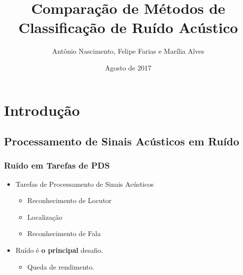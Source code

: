 \documentclass{beamer}
\title[Ciência de Dados]{Comparação de Métodos de Classificação de Ruído Acústico}
\author[Nascimento, Farias, Alves]
{
Antônio Nascimento, Felipe Farias e Marília Alves
}
\institute[IME]{%
Instituto Militar de Engenharia \\
}
\date[Agosto de 2017] %
{Agosto de 2017}
\begin{document}

\justifying

\begin{frame}
  \titlepage
\end{frame}




\section[Sumário]{}
\begin{frame}
  \tableofcontents
\end{frame}




\section{Introdução}

\subsection{Processamento de Sinais Acústicos em Ruído}

\begin{frame}
	\justifying
  	\frametitle{Ruído em Tarefas de PDS}
  	
  	\begin{itemize}
  		\setlength\itemsep{1em}
  		\item Tarefas de Processamento de Sinais Acústicos
        \begin{itemize}
        	\item Reconhecimento de Locutor
            \item Localização
            \item Reconhecimento de Fala
        \end{itemize}
        \item Ruído é \textbf{o principal} desafio.
        \begin{itemize}
        \item Queda de rendimento.
        \end{itemize}
  	\end{itemize}
\end{frame}
\end{document}
